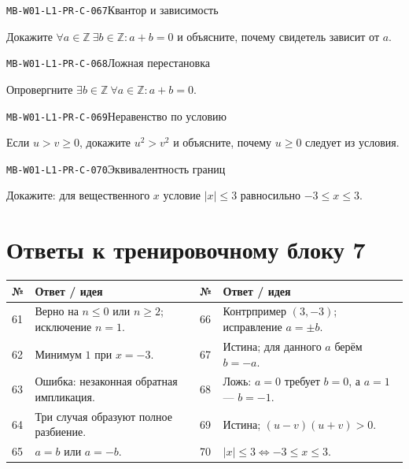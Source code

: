 \documentclass[11pt,a4paper,openany]{book}
\newcommand{\muid}[1]{\texttt{\footnotesize #1}}
\renewcommand{\arraystretch}{1.38}
\begin{document}
\noindent\hypertarget{MB-W01-L1-PR-C-067}{}\muid{MB-W01-L1-PR-C-067}\quad Квантор и зависимость\par

Докажите $\forall a\in\mathbb Z\ \exists b\in\mathbb Z\colon a+b=0$ и объясните, почему свидетель зависит от $a$.\par\medskip

\noindent\hypertarget{MB-W01-L1-PR-C-068}{}\muid{MB-W01-L1-PR-C-068}\quad Ложная перестановка\par

Опровергните $\exists b\in\mathbb Z\ \forall a\in\mathbb Z\colon a+b=0$.\par\medskip

\noindent\hypertarget{MB-W01-L1-PR-C-069}{}\muid{MB-W01-L1-PR-C-069}\quad Неравенство по условию\par

Если $u>v\ge0$, докажите $u^2>v^2$ и объясните, почему $u\ge0$ следует из условия.\par\medskip

\noindent\hypertarget{MB-W01-L1-PR-C-070}{}\muid{MB-W01-L1-PR-C-070}\quad Эквивалентность границ\par

Докажите: для вещественного $x$ условие $|x|\le3$ равносильно $-3\le x\le3$.\par\medskip

\clearpage\section*{Ответы к тренировочному блоку 7}


\begingroup\footnotesize\renewcommand{\arraystretch}{1.45}

\begin{tabularx}{\textwidth}{@{}p{10mm}X p{10mm}X@{}}\toprule № & Ответ / идея & № & Ответ / идея\\\midrule

61 & Верно на $n\le0$ или $n\ge2$; исключение $n=1$. & 66 & Контрпример $(3,-3)$; исправление $a=\pm b$.\\

62 & Минимум $1$ при $x=-3$. & 67 & Истина; для данного $a$ берём $b=-a$.\\

63 & Ошибка: незаконная обратная импликация. & 68 & Ложь: $a=0$ требует $b=0$, а $a=1$ — $b=-1$.\\

64 & Три случая образуют полное разбиение. & 69 & Истина; $(u-v)(u+v)>0$.\\

65 & $a=b$ или $a=-b$. & 70 & $|x|\le3\Leftrightarrow-3\le x\le3$.\\

\bottomrule\end{tabularx}\endgroup
\end{document}
